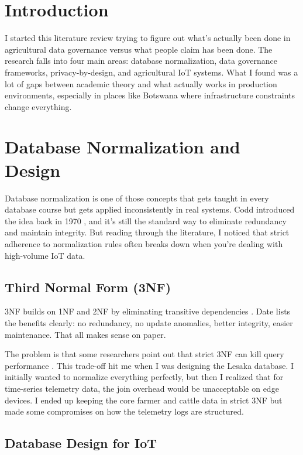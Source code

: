 
\section{Introduction}

I started this literature review trying to figure out what's actually been done in agricultural data governance versus what people claim has been done. The research falls into four main areas: database normalization, data governance frameworks, privacy-by-design, and agricultural IoT systems. What I found was a lot of gaps between academic theory and what actually works in production environments, especially in places like Botswana where infrastructure constraints change everything.

\section{Database Normalization and Design}

Database normalization is one of those concepts that gets taught in every database course but gets applied inconsistently in real systems. Codd introduced the idea back in 1970 \cite{codd1970relational}, and it's still the standard way to eliminate redundancy and maintain integrity. But reading through the literature, I noticed that strict adherence to normalization rules often breaks down when you're dealing with high-volume IoT data.

\subsection{Third Normal Form (3NF)}

3NF builds on 1NF and 2NF by eliminating transitive dependencies \cite{date2003database}. Date lists the benefits clearly: no redundancy, no update anomalies, better integrity, easier maintenance. That all makes sense on paper.

The problem is that some researchers point out that strict 3NF can kill query performance \cite{navathe2020database}. This trade-off hit me when I was designing the Lesaka database. I initially wanted to normalize everything perfectly, but then I realized that for time-series telemetry data, the join overhead would be unacceptable on edge devices. I ended up keeping the core farmer and cattle data in strict 3NF but made some compromises on how the telemetry logs are structured.

\subsection{Database Design for IoT}

